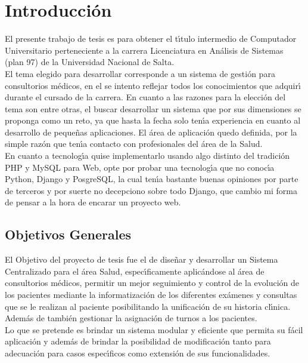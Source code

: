 \chapter{Introducci\'on}

El presente trabajo de tesis es para obtener el t\'{\i}tulo intermedio de Computador 
Universitario perteneciente a la carrera Licenciatura en An\'alisis de Sistemas (plan 97)
de la Universidad Nacional de Salta.\\[0.1cm]

El tema elegido para desarrollar corresponde a un sistema de gesti\'on para consultorios m\'edicos, 
en el se intento reflejar todos los conocimientos que adquir\'{\i} durante el cursado de 
la carrera. En cuanto a las razones para la elecci\'on del tema son entre otras, el buscar
desarrollar un sistema que por sus dimensiones se proponga como un reto, ya que hasta la 
fecha solo ten\'{\i}a experiencia en cuanto al desarrollo de peque\~nas aplicaciones. 
El \'area de aplicaci\'on quedo definida, por la simple raz\'on que ten\'{\i}a contacto
con profesionales del \'area de la Salud.\\[0.1cm]

En cuanto a tecnolog\'{\i}a quise implementarlo usando algo distinto del tradici\'on PHP 
y MySQL para Web, opte por probar una tecnolog\'{\i}a que no conoc\'{\i}a Python, Django
y PosgreSQL, la cual ten\'{\i}a bastante buenas opiniones por parte de terceros y por 
suerte no decepciono sobre todo Django, que cambio mi forma de pensar a la hora de encarar
un proyecto web.\\[0.1cm]


\section{Objetivos Generales}

El Objetivo del proyecto de tesis fue el de dise\~nar y desarrollar un Sistema Centralizado 
para el \'area Salud, espec\'{\i}ficamente aplic\'andose al \'area de consultorios m\'edicos, 
permitir un mejor seguimiento y control de la evoluci\'on de los pacientes mediante la 
informatizaci\'on de los diferentes ex\'amenes y consultas que se le realizan al paciente 
posibilitando la unificaci\'on de su historia cl\'{\i}nica. Adem\'as de tambi\'en gestionar 
la asignaci\'on de turnos a los pacientes.\\[0.1cm]

Lo que se pretende es brindar un sistema modular y eficiente que permita su f\'acil 
aplicaci\'on y adem\'as de brindar la posibilidad de modificaci\'on tanto para adecuaci\'on 
para casos espec\'{\i}ficos como extensi\'on de sus funcionalidades.\\[0.1cm]


